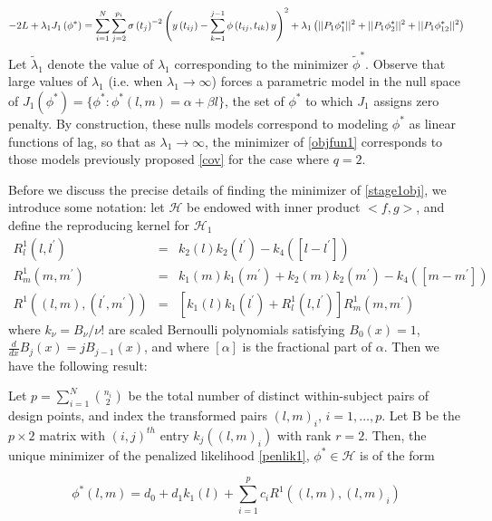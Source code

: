 \documentclass[12pt]{article}
\newcommand{\lmr}{\fontfamily{lmr}\selectfont} %
\newcommand{\matB}{\mbox{B}}
\newenvironment{theorem}[1][Theorem]{\begin{trivlist}
\item[\hskip \labelsep {\bfseries #1}]}{\end{trivlist}}
\begin{document}
\begin{equation}
-2\lmr{L} + \lambda_1 J_1\left(\phi^*\right) = \sum_{i=1}^N \sum_{j=2}^{p_i} \sigma\left({t_j}\right)^{-2} \left(y\left({t_{ij}}\right) - \sum_{k=1}^{j-1}\phi\left({t_{ij},t_{ik}}\right)y\right)^2 + \lambda_1 \left(\vert \vert {P_1 \phi_1^*} \vert \vert^2 + \vert \vert {P_1 \phi_2^*} \vert \vert^2 + \vert \vert {P_1 \phi_{12}^*} \vert \vert^2 \right) \label{stage1obj}
\end{equation}
Let $\tilde{\lambda}_1$ denote the value of $\lambda_1$ corresponding to the minimizer $\tilde{\phi}^*$. Observe that large values of $\lambda_1$ (i.e. when $\lambda_1 \rightarrow \infty$) forces a parametric model in the null space of $J_1\left(\phi^*\right) = \lbrace \phi^*: \phi^*\left(l,m\right) = \alpha + \beta l \rbrace$, the set of $\phi^*$ to which $J_1$ assigns zero penalty. By construction, these nulls models correspond to modeling $\phi^*$ as linear functions of lag, so that as $\lambda_1 \rightarrow \infty$, the minimizer of \eqref{objfun1} corresponds to those models previously proposed \eqref{cov} for the case where $q=2$. 

Before we discuss the precise details of finding the minimizer of \eqref{stage1obj}, we introduce some notation: let $\mathcal{H}$ be endowed with inner product $\big < f,g\big >$, and define the reproducing kernel for $\mathcal{H}_1$  
\begin{eqnarray} \nonumber
R_l^1\left(l,l^\prime\right) &=& k_2\left(l \right)k_2\left(l^\prime \right) - k_{4}\left(\left[ l-l^\prime \right] \right)\\ \nonumber
R_m^1\left(m,m^\prime\right) &=& k_1\left(m \right)k_1\left(m^\prime \right) + k_2\left(m \right)k_2\left(m^\prime \right) - k_{4}\left(\left[ m-m^\prime \right] \right)\\
R^1\left(\left(l,m\right),\left(l^\prime,m^\prime\right)  \right) &=& \left[k_1\left(l\right)k_1\left(l^\prime \right) +  R_l^1\left(l,l^\prime\right)\right] R_m^1\left(m,m^\prime\right) \label{TPRK}
\end{eqnarray}
where $k_\nu = B_\nu/\nu!$ are scaled Bernoulli polynomials satisfying $B_0\left(x\right) = 1$, $\frac{d}{dx} B_j\left(x\right) = jB_{j-1}\left(x\right)$, and where $\left[ \alpha \right]$ is the fractional part of $\alpha$. Then we have the following result:

\begin{theorem}
Let $p= \sum_{i=1}^N {n_i \choose 2}$ be the total number of distinct within-subject pairs of design points, and index the transformed pairs $\left( l,m \right)_i$, $i=1, \dots,p$. Let $\matB$ be the $p \times 2$ matrix with $\left(i,j\right)^{th}$ entry $k_j\left( \left( l,m \right)_i \right)$ with rank $r=2$. Then, the unique minimizer of the penalized likelihood \eqref{penlik1}, $\phi^* \in \mathcal{H}$ is of the form

\begin{equation}
\phi^*\left(l,m\right) = d_0 + d_1 k_1\left(l\right) + \sum_{i=1}^{p} c_i R^1\left( \left(l,m\right) , \left(l,m \right)_i\right)
 \label{eq:finitedimsolution}
\end{equation}
\end{theorem}
\end{document}
